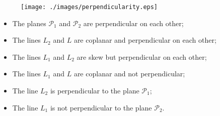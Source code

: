 \begin{frame}
%
\begin{figure}[h]
  \texttt{[image: ./images/perpendicularity.eps]}
  \label{fig:perpendicularity}
\end{figure}
%
\begin{itemize}
%
\item The planes $\mathcal{P}_1$ and $\mathcal{P}_2$ are perpendicular on each other;
%
\item The lines $L_2$ and $L$ are coplanar and perpendicular on each other;
%
\item The lines $L_1$ and $L_2$ are skew but perpendicular on each other;
%
\item The lines $L_1$ and $L$ are coplanar and not perpendicular;
%
\item The line $L_2$ is perpendicular to the plane $\mathcal{P}_1$;
%
\item The line $L_1$ is not perpendicular to the plane $\mathcal{P}_2$.
\end{itemize}

\end{frame}